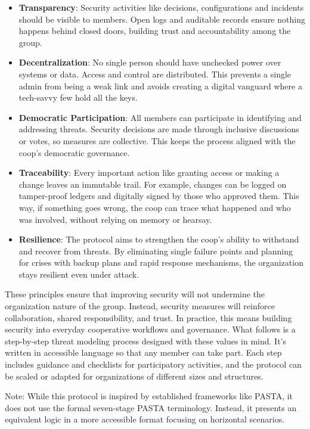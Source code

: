 \begin{itemize}
    \item \textbf{Transparency}: Security activities like decisions,
configurations and incidents should be visible to members. Open logs and
auditable records ensure nothing happens behind closed doors, building trust
and accountability among the group.
    \item \textbf{Decentralization}: No single person should have unchecked
power over systems or data. Access and control are distributed. This prevents a
single admin from being a weak link and avoids creating a digital vanguard
where a tech-savvy few hold all the keys.
    \item \textbf{Democratic Participation}: All members can participate in
identifying and addressing threats. Security decisions are made through
inclusive discussions or votes, so measures are collective. This keeps
the process aligned with the coop's democratic governance.
    \item \textbf{Traceability}: Every important action like granting access or making
a change leaves an immutable trail. For example, changes can be logged on
tamper-proof ledgers and digitally signed by those who approved them. This way,
if something goes wrong, the coop can trace what happened and who was involved,
without relying on memory or hearsay.
    \item \textbf{Resilience}: The protocol aims to strengthen the coop's
ability to withstand and recover from threats. By eliminating single failure
points and planning for crises with backup plans and rapid response
mechanisms, the organization stays resilient even under attack.
\end{itemize}

These principles ensure that improving security will not undermine the
organization nature of the group. Instead, security measures will reinforce
collaboration, shared responsibility, and trust. In practice, this means
building security into everyday cooperative workflows and governance. What
follows is a step-by-step threat modeling process designed with these values in
mind. It's written in accessible language so that any member can take part.
Each step includes guidance and checklists for participatory activities,
and the protocol can be scaled or adapted for organizations of different
sizes and structures.

Note: While this protocol is inspired by established frameworks like PASTA,
it does not use the formal seven-stage PASTA terminology. Instead, it
presents an equivalent logic in a more accessible format focusing on
horizontal scenarios.


